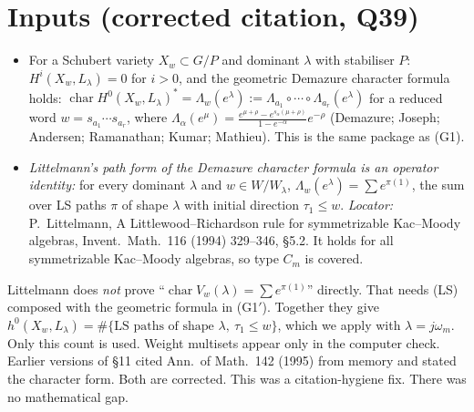 \documentclass[10pt]{amsart}
\theoremstyle{remark}
\begin{document}
\section{Inputs (corrected citation, Q39)}
\begin{itemize}
\item[(G1$'$)] For a Schubert variety $X_w\subset G/P$ and dominant $\lambda$ with stabiliser $P$: $H^i(X_w,L_\lambda)=0$ for
$i>0$, and the geometric Demazure character formula holds:
$\operatorname{char}H^0(X_w,L_\lambda)^*=\Lambda_w(e^\lambda):=\Lambda_{a_1}\circ\cdots\circ\Lambda_{a_r}(e^\lambda)$ for a
reduced word $w=s_{a_1}\cdots s_{a_r}$, where
$\Lambda_\alpha(e^\mu)=\frac{e^{\mu+\rho}-e^{s_\alpha(\mu+\rho)}}{1-e^{-\alpha}}e^{-\rho}$
(Demazure; Joseph; Andersen; Ramanathan; Kumar; Mathieu). This is the same package as (G1).
\item[(LS)] \emph{Littelmann's path form of the Demazure character formula is an operator identity:} for every dominant
$\lambda$ and $w\in W/W_\lambda$,
$\Lambda_w(e^\lambda)=\sum e^{\pi(1)}$, the sum over LS paths $\pi$ of shape $\lambda$ with initial direction $\tau_1\le w$.
\emph{Locator:} P.~Littelmann, A Littlewood--Richardson rule for symmetrizable Kac--Moody algebras, Invent.\ Math.\ 116 (1994)
329--346, \S5.2. It holds for all symmetrizable Kac--Moody algebras, so type $C_m$ is covered.
\end{itemize}
Littelmann does \emph{not} prove ``$\operatorname{char}V_w(\lambda)=\sum e^{\pi(1)}$'' directly. That needs (LS) composed
with the geometric formula in (G1$'$). Together they give
$h^0(X_w,L_\lambda)=\#\{\text{LS paths of shape }\lambda,\ \tau_1\le w\}$, which we apply with $\lambda=j\omega_m$. Only
this count is used. Weight multisets appear only in the computer check. Earlier versions of \S11 cited Ann.\ of Math.\ 142
(1995) from memory and stated the character form. Both are corrected. This was a citation-hygiene fix. There was no
mathematical gap.
\end{document}
